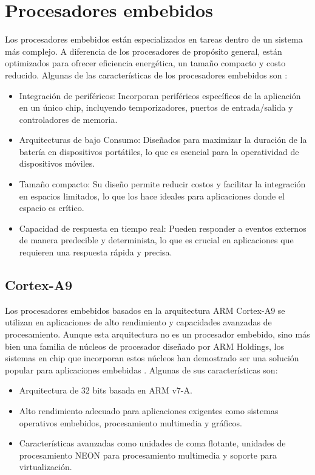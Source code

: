 \section{Procesadores embebidos}

Los procesadores embebidos están especializados en tareas dentro de un sistema más complejo. A diferencia de los procesadores de propósito general, están 
optimizados para ofrecer eficiencia energética, un tamaño compacto y costo reducido. Algunas de las características de los procesadores embebidos son \cite{gombau2016procesadores}:

\begin{itemize}
    \item Integración de periféricos: Incorporan periféricos específicos de la aplicación en un único chip, incluyendo temporizadores, puertos de entrada/salida y controladores 
    de memoria.
    \item Arquitecturas de bajo Consumo: Diseñados para maximizar la duración de la batería en dispositivos portátiles, lo que es esencial para la operatividad de dispositivos 
    móviles.
    \item Tamaño compacto: Su diseño permite reducir costos y facilitar la integración en espacios limitados, lo que los hace ideales para aplicaciones donde el espacio es 
    crítico.
    \item Capacidad de respuesta en tiempo real: Pueden responder a eventos externos de manera predecible y determinista, lo que es crucial en aplicaciones que requieren una respuesta rápida y precisa.
\end{itemize}

\subsection{Cortex-A9}

Los procesadores embebidos basados en la arquitectura ARM Cortex-A9 se utilizan en aplicaciones de alto rendimiento y capacidades avanzadas de procesamiento.
Aunque esta arquitectura no es un procesador embebido, sino más bien una familia de núcleos de procesador diseñado por ARM Holdings, los sistemas en chip que incorporan
estos núcleos han demostrado ser una solución popular para aplicaciones embebidas \cite{Schwiegelshohn2014DesignOA}. Algunas de sus características son: 

\begin{itemize}
    \item Arquitectura de 32 bits basada en ARM v7-A.
    \item Alto rendimiento adecuado para aplicaciones exigentes como sistemas operativos embebidos, procesamiento multimedia y gráficos.
    \item Características avanzadas como unidades de coma flotante, unidades de procesamiento NEON para procesamiento multimedia y soporte para virtualización.
\end{itemize}

